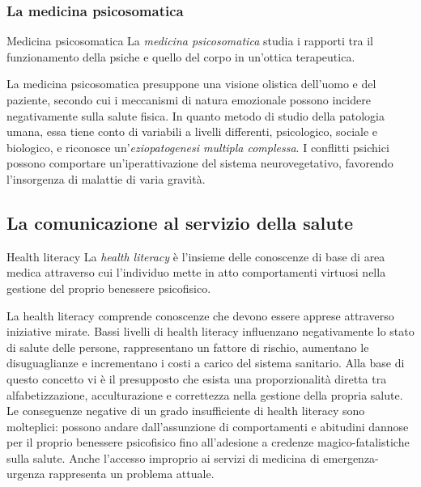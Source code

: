 \documentclass[a4paper]{article}
\begin{document}
\subsubsection{La medicina psicosomatica}
\begin{snippetdefinition}{Medicina psicosomatica}
    La \emph{medicina psicosomatica} studia i rapporti tra il funzionamento della psiche e quello del corpo in un'ottica terapeutica.
\end{snippetdefinition}
La medicina psicosomatica presuppone una visione olistica dell'uomo e del paziente, secondo cui i meccanismi di natura emozionale possono incidere negativamente sulla salute fisica.
In quanto metodo di studio della patologia umana, essa tiene conto di variabili a livelli differenti, psicologico, sociale e biologico, e riconosce un'\emph{eziopatogenesi multipla complessa}.
I conflitti psichici possono comportare un'iperattivazione del sistema neurovegetativo, favorendo l'insorgenza di malattie di varia gravità.
\subsection{La comunicazione al servizio della salute}
\begin{snippetdefinition}{Health literacy}
    La \emph{health literacy} è l'insieme delle conoscenze di base di area medica attraverso cui l'individuo mette in atto comportamenti virtuosi nella gestione del proprio benessere psicofisico.
\end{snippetdefinition}
La health literacy comprende conoscenze che devono essere apprese attraverso iniziative mirate.
Bassi livelli di health literacy influenzano negativamente lo stato di salute delle persone, rappresentano un fattore di rischio, aumentano le disuguaglianze e incrementano i costi a carico del sistema sanitario.
Alla base di questo concetto vi è il presupposto che esista una proporzionalità diretta tra alfabetizzazione, acculturazione e correttezza nella gestione della propria salute.
Le conseguenze negative di un grado insufficiente di health literacy sono molteplici: possono andare dall'assunzione di comportamenti e abitudini dannose per il proprio benessere psicofisico fino all'adesione a credenze magico-fatalistiche sulla salute.
Anche l'accesso improprio ai servizi di medicina di emergenza-urgenza rappresenta un problema attuale.
\end{document}
